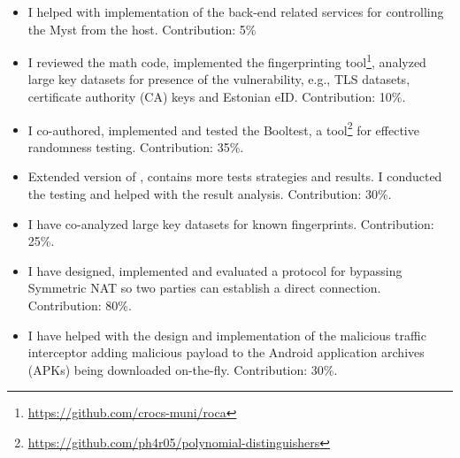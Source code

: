 \documentclass[
  digital, %
  twoside, %
  table,   %
  lof,     %
  lot,     %
]{fithesis3}
\newcounter{ph4_show_guides}
\theoremstyle{definition}
\theoremstyle{remark}
\begin{document}
\begin{itemize}
	\item {}
	I helped with implementation of the back-end related services for controlling the Myst from the host. Contribution: 5\%
	
	\item {}
	I reviewed the math code, implemented the fingerprinting tool\footnote{\url{https://github.com/crocs-muni/roca}}, analyzed large key datasets for presence of the vulnerability, e.g., TLS datasets, certificate authority (CA) keys and Estonian eID. Contribution: 10\%.
	
	\item {}
	I co-authored, implemented and tested the Booltest, a tool\footnote{\url{https://github.com/ph4r05/polynomial-distinguishers}} for effective randomness testing. Contribution: 35\%.
	
	\item {}
	Extended version of \cite{booltest_secrypt2017}, contains more tests strategies and results. I conducted the testing and helped with the result analysis. Contribution: 30\%.
	
	\item {}
	I have co-analyzed large key datasets for known fingerprints. Contribution: 25\%.
	
	\item {}
	I have designed, implemented and evaluated a protocol for bypassing Symmetric NAT so two parties can establish a direct connection. Contribution: 80\%.
	
	\item {}
	I have helped with the design and implementation of the malicious traffic interceptor adding malicious payload to the Android application archives (APKs) being downloaded on-the-fly. Contribution: 30\%.
	

\end{itemize}
\end{document}
